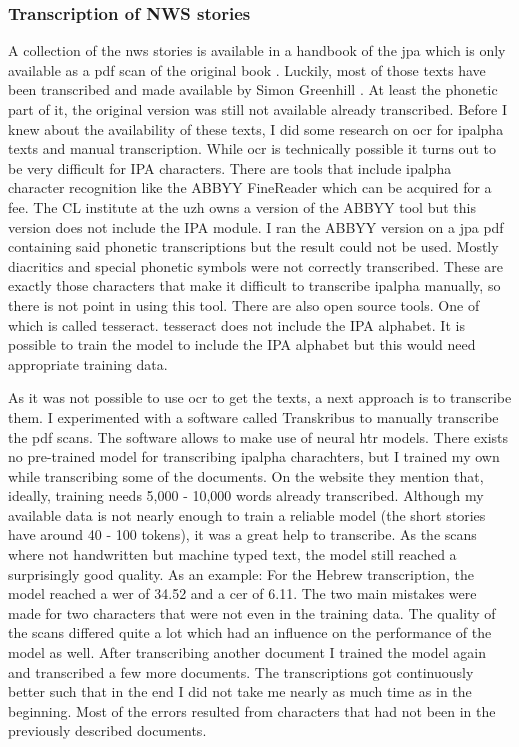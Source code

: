 \subsubsection{Transcription of NWS stories}
A collection of the \ac{nws} stories is available in a handbook of the \ac{jpa} which is only available as a pdf scan of the original book \citep{JIPA2010}. Luckily, most of those texts have been transcribed and made available by Simon Greenhill \citep{GitHub.04.02.2022}. At least the phonetic part of it, the original version was still not available already transcribed. Before I knew about the availability of these texts, I did some research on \ac{ocr} for \ac{ipalpha} texts and manual transcription. While \ac{ocr} is technically possible it turns out to be very difficult for IPA characters. There are tools that include \ac{ipalpha} character recognition like the ABBYY FineReader which can be acquired for a fee. The CL institute at the \ac{uzh} owns a version of the ABBYY tool but this version does not include the IPA module. I ran the ABBYY version on a \ac{jpa} pdf containing said phonetic transcriptions but the result could not be used. Mostly diacritics and special phonetic symbols were not correctly transcribed. These are exactly those characters that make it difficult to transcribe \ac{ipalpha} manually, so there is not point in using this tool. There are also open source tools. One of which is called tesseract. tesseract does not include the IPA alphabet. It is possible to train the model to include the IPA alphabet but this would need appropriate training data.

As it was not possible to use \ac{ocr} to get the texts, a next approach is to transcribe them. I experimented with a software called Transkribus to manually transcribe the pdf scans. The software allows to make use of neural \ac{htr} models. There exists no pre-trained model for transcribing \ac{ipalpha} charachters, but I trained my own while transcribing some of the documents. On the website they mention that, ideally, training needs 5,000 - 10,000 words already transcribed. Although my available data is not nearly enough to train a reliable model (the short stories have around 40 - 100 tokens), it was a great help to transcribe. As the scans where not handwritten but machine typed text, the model still reached a surprisingly good quality. As an example: For the Hebrew transcription, the model reached a \ac{wer} of 34.52 and a \ac{cer} of 6.11. The two main mistakes were made for two characters that were not even in the training data. The quality of the scans differed quite a lot which had an influence on the performance of the model as well. After transcribing another document I trained the model again and transcribed a few more documents. The transcriptions got continuously better such that in the end I did not take me nearly as much time as in the beginning. Most of the errors resulted from characters that had not been in the previously described documents. 

